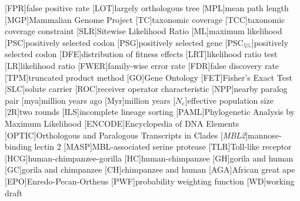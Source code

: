 
[FPR]{false positive rate}
[LOT]{largely orthologous tree}
[MPL]{mean path length}
[MGP]{Mammalian Genome Project}
[TC]{taxonomic coverage}
[TCC]{taxonomic coverage constraint}
[SLR]{Sitewise Likelihood Ratio}
[ML]{maximum likelihood}
[PSC]{positively selected codon}
[PSG]{positively selected gene}
[PSC$_{5\%}$]{positively selected codon}
[DFE]{distribution of fitness effects}
[LRT]{likelihood ratio test}
[LR]{likelihood ratio}
[FWER]{family-wise error rate}
[FDR]{false discovery rate}
[TPM]{truncated product method}
[GO]{Gene Ontology}
[FET]{Fisher's Exact Test}
[SLC]{solute carrier}
[ROC]{receiver operator characteristic}
[NPP]{nearby paralog pair}
[mya]{million years ago}
[Myr]{million years}
[$N_{e}$]{effective population size}
[2R]{two rounds}
[ILS]{incomplete lineage sorting}
[PAML]{Phylogenetic Analysis by Maximum Likelihood}
[ENCODE]{Encyclopedia of DNA Elements}
[OPTIC]{Orthologous and Paralogous Transcripts in Clades}
[\emph{MBL2}]{mannose-binding lectin 2}
[MASP]{MBL-associated serine protease}
[TLR]{Toll-like receptor}
[HCG]{human-chimpanzee-gorilla}
[HC]{human-chimpanzee}
[GH]{gorila and human}
[GC]{gorila and chimpanzee}
[CH]{chimpanzee and human}
[AGA]{African great ape}
[EPO]{Enredo-Pecan-Ortheus}
[PWF]{probability weighting function}
[WD]{working draft}

\newcommand{\tocite}[2]{}
\newcommand{\changeme}[1]{#1\xspace}

\newcommand{\TODO}[1]{\textcolor{red}{TODO} \todo{#1}\xspace}
\newcommand{\draft}[1]{\textcolor{gray}{[#1]}\xspace}

\newcommand{\gene}[1]{\emph{#1}}
\newcommand{\species}[1]{\emph{#1}}

\newcommand{\ntrees}{16,477\xspace}

\newcommand{\syn}{synonymous\xspace}
\newcommand{\nsyn}{nonsynonymous\xspace}

